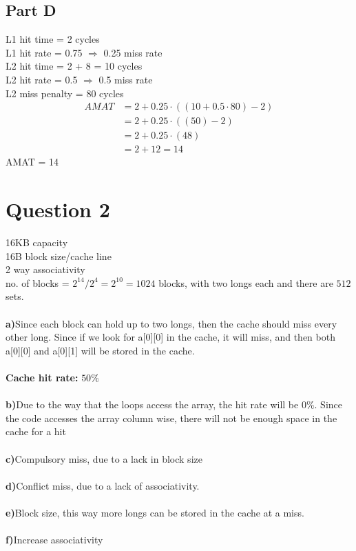 \documentclass[12pt]{article}
\begin{document}
\subsection*{Part D}
L1 hit time = 2 cycles\\
L1 hit rate = 0.75 $\Rightarrow$ 0.25 miss rate\\
L2 hit time = 2 + 8 = 10 cycles\\
L2 hit rate = 0.5 $\Rightarrow$ 0.5 miss rate\\
L2 miss penalty = 80 cycles
\begin{align*}
AMAT &= 2 + 0.25 \cdot ((10 + 0.5 \cdot 80) - 2)\\
&= 2 + 0.25 \cdot ((50) - 2)\\
&= 2 + 0.25 \cdot (48)\\
&= 2 + 12 = 14
\end{align*}
AMAT = 14
\section*{Question 2}
16KB capacity\\
16B block size/cache line\\
2 way associativity\\
no. of blocks = $2^{14} / 2^{4} = 2 ^{10} = 1024$ blocks, with two longs each and there are $512$ sets.\\\\
\textbf{a)}Since each block can hold up to two longs, then the cache should miss every other long. Since if we look for a[0][0] in the cache, it will miss, and then both a[0][0] and a[0][1] will be stored in the cache.\\\\
\textbf{Cache hit rate:} $50\%$\\\\
\textbf{b)}Due to the way that the loops access the array, the hit rate will be $0\%$. Since the code accesses the array column wise, there will not be enough space in the cache for a hit\\\\
\textbf{c)}Compulsory miss, due to a lack in block size\\\\
\textbf{d)}Conflict miss, due to a lack of associativity. \\\\
\textbf{e)}Block size, this way more longs can be stored in the cache at a miss.\\\\
\textbf{f)}Increase associativity
\end{document}

